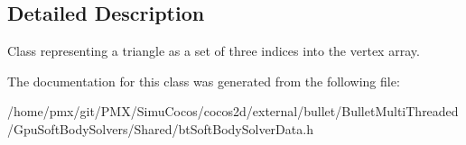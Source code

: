 \subsection{Detailed Description}
Class representing a triangle as a set of three indices into the vertex array. 

The documentation for this class was generated from the following file\+:\begin{DoxyCompactItemize}
\item 
/home/pmx/git/\+P\+M\+X/\+Simu\+Cocos/cocos2d/external/bullet/\+Bullet\+Multi\+Threaded/\+Gpu\+Soft\+Body\+Solvers/\+Shared/bt\+Soft\+Body\+Solver\+Data.\+h\end{DoxyCompactItemize}
